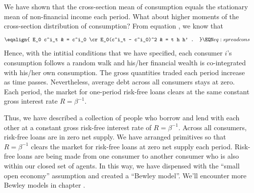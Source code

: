 We have shown that the cross-section mean of 
consumption equals the stationary mean of non-financial 
income each period. 
What about higher moments of the 
cross-section distribution of consumption? 
From equation , we know that
$$ \eqalign{ E_0 c^i_t & = c^i_0 \cr
              E_0(c^i_t  - c^i_0)^2 & = t h h' . } 
                                 \EQN eq:spreadcons $$
Hence, with the intitial conditions that we have specified, each consumer $i$'s consumption follows a random walk and his/her financial wealth is co-integrated with his/her own consumption. The gross quantities  traded each period increase as time passes. Nevertheless,  average debt across  all consumers stays at zero.   Each period, the market for one-period risk-free loans clears at the same 
constant gross interest rate $R = \beta^{-1}$. 


Thus, we have described a collection of  people who   borrow and lend
with each other at a  constant gross risk-free interest rate of
$R = \beta^{-1}$.
Across all consumers, risk-free loans are in zero net supply.
We have arranged primitives so that $R = \beta^{-1}$ clears the market for risk-free loans at zero net supply each period. 
Risk-free loans are being made from one consumer to another  consumer who is also within our closed set of agents.
In this way, we have dispensed with the ``small open economy'' assumption and created a 
 ``Bewley model''.  We'll encounter  more Bewley models in chapter .
%




